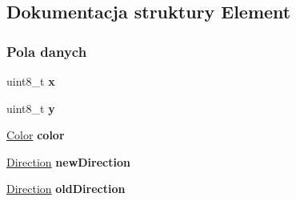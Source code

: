 \hypertarget{struct_element}{}\subsection{Dokumentacja struktury Element}
\label{struct_element}
\subsubsection*{Pola danych}
\begin{DoxyCompactItemize}
\item 
\mbox{\label{struct_element_a4643d4dbcab1e3bdf24a3d35da87f4b9}} 
uint8\+\_\+t {\bfseries x}
\item 
\mbox{\label{struct_element_ac3e7ade005bd312da39c6de719766da3}} 
uint8\+\_\+t {\bfseries y}
\item 
\mbox{\label{struct_element_a9781fe6a6c006c7a5f69c94b0847534f}} 
\hyperlink{_l_c_d_controller_8h_ab87bacfdad76e61b9412d7124be44c1c}{Color} {\bfseries color}
\item 
\mbox{\label{struct_element_a0dc6b6a375e121b89fce81e4164d7d49}} 
\hyperlink{_accelerometer_controller_8h_a224b9163917ac32fc95a60d8c1eec3aa}{Direction} {\bfseries new\+Direction}
\item 
\mbox{\label{struct_element_a87aaf7a70b810a2664b23dccfce488ca}} 
\hyperlink{_accelerometer_controller_8h_a224b9163917ac32fc95a60d8c1eec3aa}{Direction} {\bfseries old\+Direction}
\end{DoxyCompactItemize}
